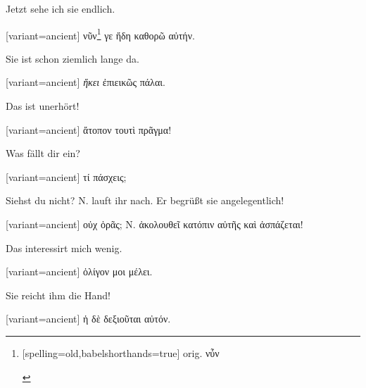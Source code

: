 Jetzt sehe ich sie endlich. 

\switchcolumn

\begin{greek}[variant=ancient]%
νῦν\footnote{\begin{german}[spelling=old,babelshorthands=true]%
orig. \textgreek[variant=ancient]{νὖν}\end{german}%
} γε ἤδη καθορῶ αὐτήν.

\end{greek}%
\switchcolumn*

Sie ist schon ziemlich lange da. 

\switchcolumn

\begin{greek}[variant=ancient]%
\emph{ἥκει} ἐπιεικῶς πάλαι.

\end{greek}%
\switchcolumn*

Das ist unerhört! 

\switchcolumn

\begin{greek}[variant=ancient]%
ἄτοπον τουτὶ πρᾶγμα!

\end{greek}%
\switchcolumn*

Was fällt dir ein? 

\switchcolumn

\begin{greek}[variant=ancient]%
τί πάσχεις;

\end{greek}%
\switchcolumn*

Siehst du nicht? N. lauft ihr nach. Er begrüßt sie angelegentlich! 

\switchcolumn

\begin{greek}[variant=ancient]%
οὐχ ὁρᾶς; Ν. ἀκολουθεῖ κατόπιν αὐτῆς καὶ ἀσπάζεται!

\end{greek}%
\switchcolumn*

Das interessirt mich wenig. 

\switchcolumn

\begin{greek}[variant=ancient]%
ὀλίγον μοι μέλει.

\end{greek}%
\switchcolumn*

Sie reicht ihm die Hand! 

\switchcolumn

\begin{greek}[variant=ancient]%
ἡ δὲ δεξιοῦται αὐτόν.

\end{greek}%
\switchcolumn*

